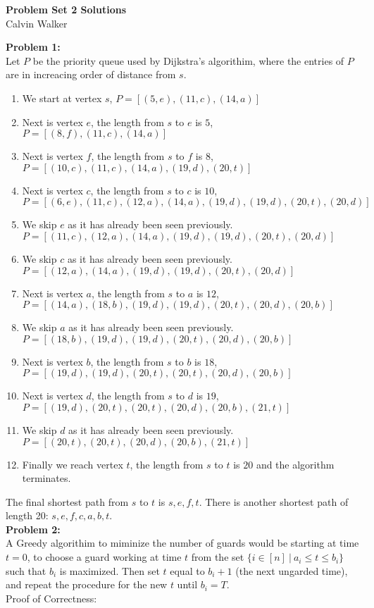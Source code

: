 \documentclass{article}
\begin{document}
\begin{center}
    \Large{\textbf{Problem Set 2 Solutions}} \\[0.25ex]
    Calvin Walker
\end{center}
\textbf{Problem 1:} \\[1.0ex]
Let $P$ be the priority queue used by Dijkstra's algorithim, where the entries of $P$ are in increacing order of distance from $s$.
\begin{enumerate}
    \item We start at vertex $s$, $P = [(5, e), (11, c), (14, a)]$
    \item Next is vertex $e$, the length from $s$ to $e$ is $5$, $P = [(8, f), (11, c), (14, a)]$
    \item Next is vertex $f$, the length from $s$ to $f$ is $8$, $P = [(10, c), (11, c), (14, a), (19, d), (20, t)]$
    \item Next is vertex $c$, the length from $s$ to $c$ is $10$, $P = [(6, e), (11, c), (12, a), (14, a), (19, d), (19, d), (20, t), (20, d)]$
    \item We skip $e$ as it has already been seen previously. $P = [(11, c), (12, a), (14, a), (19, d), (19, d), (20, t), (20, d)]$
    \item We skip $c$ as it has already been seen previously. $P = [(12, a), (14, a), (19, d), (19, d), (20, t), (20, d)]$
    \item Next is vertex $a$, the length from $s$ to $a$ is $12$, $P = [(14, a), (18, b), (19, d), (19, d), (20, t), (20, d), (20, b)]$
    \item We skip $a$ as it has already been seen previously. $P = [(18, b), (19, d), (19, d), (20, t), (20, d), (20, b)]$
    \item Next is vertex $b$, the length from $s$ to $b$ is $18$, $P = [(19, d), (19, d), (20, t), (20, t), (20, d), (20, b)]$
    \item Next is vertex $d$, the length from $s$ to $d$ is $19$, $P = [(19, d), (20, t), (20, t), (20, d), (20, b), (21, t)]$
    \item We skip $d$ as it has already been seen previously. $P = [(20, t), (20, t), (20, d), (20, b), (21, t)]$
    \item Finally we reach vertex $t$, the length from $s$ to $t$ is $20$ and the algorithm terminates. 
\end{enumerate}
The final shortest path from $s$ to $t$ is $s, e, f, t$. There is another shortest path of length 20: $s, e, f, c, a, b, t$. \\[1.0ex]
\textbf{Problem 2:}  \\[1.0ex]
A Greedy algorithim to miminize the number of guards would be starting at time $t = 0$, to choose a guard working at time $t$ from the set $\{i \in [n]\ |\ a_i \leq t \leq b_i\}$ such that $b_i$ is maximized. Then set $t$ equal to $b_i + 1$ (the next ungarded time), and repeat the procedure for the new $t$ until $b_i = T$. \\[0.5ex]
Proof of Correctness: \\
\end{document}
